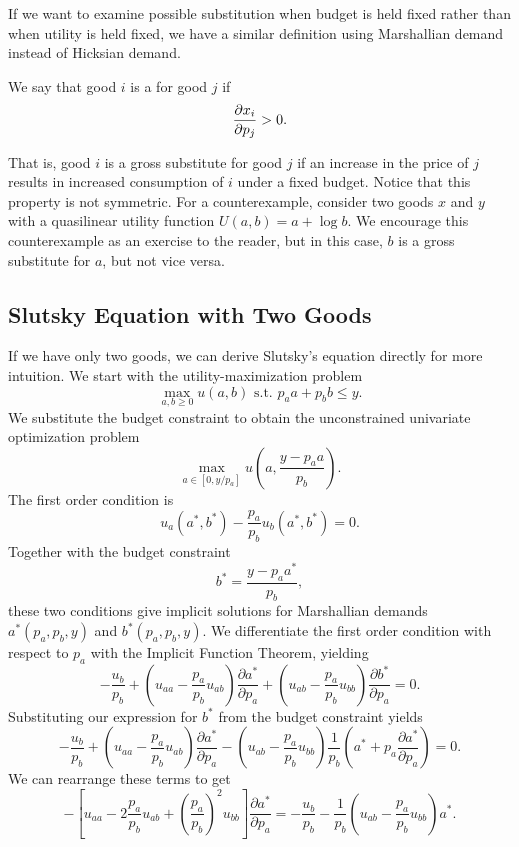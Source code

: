 If we want to examine possible substitution when budget is held fixed rather than when utility is held fixed, we have a similar definition using Marshallian demand instead of Hicksian demand.

\begin{definition*}
We say that good $i$ is a  for good $j$ if
$$\pdv{x_i}{p_j} > 0.$$
\end{definition*}
That is, good $i$ is a gross substitute for good $j$ if an increase in the price of $j$ results in increased consumption of $i$ under a fixed budget. Notice that this property is not symmetric. For a counterexample, consider two goods $x$ and $y$ with a quasilinear utility function $U(a, b) = a + \log b$. We encourage this counterexample as an exercise to the reader, but in this case, $b$ is a gross substitute for $a$, but not vice versa.

\subsection*{Slutsky Equation with Two Goods}

If we have only two goods, we can derive Slutsky's equation directly for more intuition. We start with the utility-maximization problem 
$$
\max _{a, b \geq 0} u(a, b) \text { s.t. } p_{a} a+p_{b} b \leq y.
$$
We substitute the budget constraint to obtain the unconstrained univariate optimization problem 
$$
\max _{a \in\left[0, y / p_{a}\right]} u\left(a, \frac{y-p_{a} a}{p_{b}}\right).
$$
The first order condition is 
$$
u_{a}\left(a^{*}, b^{*}\right)-\frac{p_{a}}{p_{b}} u_{b}\left(a^{*}, b^{*}\right)=0.
$$
Together with the budget constraint 
$$
b^{*}=\frac{y-p_{a} a^{*}}{p_{b}},
$$
these two conditions give implicit solutions for Marshallian demands $a^*(p_a, p_b, y)$ and $b^*(p_a, p_b, y)$.
We differentiate the first order condition with respect to $p_a$ with the Implicit Function Theorem, yielding 
$$
-\frac{u_{b}}{p_{b}}+\left(u_{a a}-\frac{p_{a}}{p_{b}} u_{a b}\right) \frac{\partial a^{*}}{\partial p_{a}}+\left(u_{a b}-\frac{p_{a}}{p_{b}} u_{b b}\right) \frac{\partial b^{*}}{\partial p_{a}}=0.
$$
Substituting our expression for $b^*$ from the budget constraint yields 
$$
-\frac{u_{b}}{p_{b}}+\left(u_{a a}-\frac{p_{a}}{p_{b}} u_{a b}\right) \frac{\partial a^{*}}{\partial p_{a}}-\left(u_{a b}-\frac{p_{a}}{p_{b}} u_{b b}\right) \frac{1}{p_{b}}\left(a^{*}+p_{a} \frac{\partial a^{*}}{\partial p_{a}}\right)=0.
$$
We can rearrange these terms to get
$$
-\left[u_{a a}-2 \frac{p_{a}}{p_{b}} u_{a b}+\left(\frac{p_{a}}{p_{b}}\right)^{2} u_{b b}\right] \frac{\partial a^{*}}{\partial p_{a}}=-\frac{u_{b}}{p_{b}}-\frac{1}{p_{b}}\left(u_{a b}-\frac{p_{a}}{p_{b}} u_{b b}\right) a^{*}.
$$

